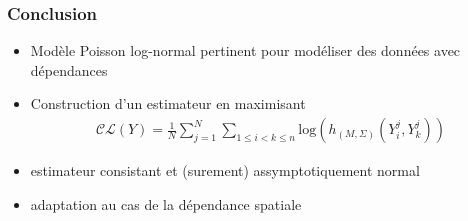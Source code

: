 \documentclass[11pt,table]{beamer}
\begin{document}




\begin{frame}

\frametitle{Conclusion}
\begin{itemize}
\item Modèle Poisson log-normal pertinent pour modéliser des données avec dépendances
\item Construction d'un estimateur en maximisant 
\begin{align*}
\mathcal{CL}(Y)= \frac{1}{N}\sum_{j=1}^N \sum_{1\leq i <k \leq n} \mathrm{log} (h_{(M,\Sigma)}(Y^j_i,Y^j_k))
\end{align*}
\item estimateur consistant et (surement) assymptotiquement normal
\item adaptation au cas de la dépendance spatiale
\end{itemize}
\end{frame}
\end{document}
